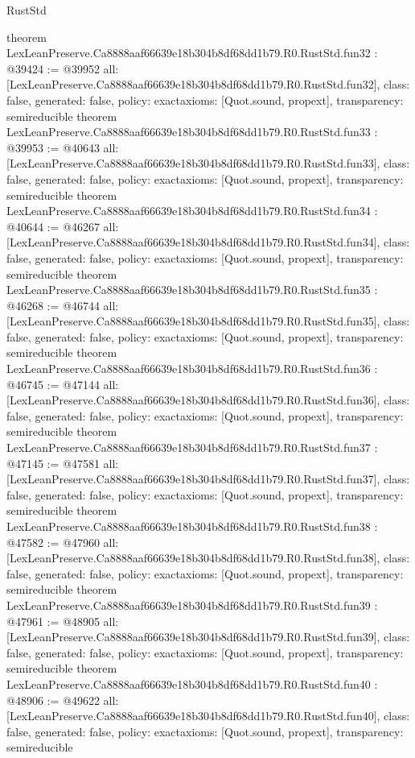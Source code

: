 \begin{lexlean}{RustStd}
\begin{coremodule}
{}
theorem LexLeanPreserve.Ca8888aaf66639e18b304b8df68dd1b79.R0.RustStd.fun32 : @39424 := @39952 {
  all: [LexLeanPreserve.Ca8888aaf66639e18b304b8df68dd1b79.R0.RustStd.fun32],
  class: false,
  generated: false,
  policy: exact{axioms: [Quot.sound, propext]},
  transparency: semireducible
}
theorem LexLeanPreserve.Ca8888aaf66639e18b304b8df68dd1b79.R0.RustStd.fun33 : @39953 := @40643 {
  all: [LexLeanPreserve.Ca8888aaf66639e18b304b8df68dd1b79.R0.RustStd.fun33],
  class: false,
  generated: false,
  policy: exact{axioms: [Quot.sound, propext]},
  transparency: semireducible
}
theorem LexLeanPreserve.Ca8888aaf66639e18b304b8df68dd1b79.R0.RustStd.fun34 : @40644 := @46267 {
  all: [LexLeanPreserve.Ca8888aaf66639e18b304b8df68dd1b79.R0.RustStd.fun34],
  class: false,
  generated: false,
  policy: exact{axioms: [Quot.sound, propext]},
  transparency: semireducible
}
theorem LexLeanPreserve.Ca8888aaf66639e18b304b8df68dd1b79.R0.RustStd.fun35 : @46268 := @46744 {
  all: [LexLeanPreserve.Ca8888aaf66639e18b304b8df68dd1b79.R0.RustStd.fun35],
  class: false,
  generated: false,
  policy: exact{axioms: [Quot.sound, propext]},
  transparency: semireducible
}
theorem LexLeanPreserve.Ca8888aaf66639e18b304b8df68dd1b79.R0.RustStd.fun36 : @46745 := @47144 {
  all: [LexLeanPreserve.Ca8888aaf66639e18b304b8df68dd1b79.R0.RustStd.fun36],
  class: false,
  generated: false,
  policy: exact{axioms: [Quot.sound, propext]},
  transparency: semireducible
}
theorem LexLeanPreserve.Ca8888aaf66639e18b304b8df68dd1b79.R0.RustStd.fun37 : @47145 := @47581 {
  all: [LexLeanPreserve.Ca8888aaf66639e18b304b8df68dd1b79.R0.RustStd.fun37],
  class: false,
  generated: false,
  policy: exact{axioms: [Quot.sound, propext]},
  transparency: semireducible
}
theorem LexLeanPreserve.Ca8888aaf66639e18b304b8df68dd1b79.R0.RustStd.fun38 : @47582 := @47960 {
  all: [LexLeanPreserve.Ca8888aaf66639e18b304b8df68dd1b79.R0.RustStd.fun38],
  class: false,
  generated: false,
  policy: exact{axioms: [Quot.sound, propext]},
  transparency: semireducible
}
theorem LexLeanPreserve.Ca8888aaf66639e18b304b8df68dd1b79.R0.RustStd.fun39 : @47961 := @48905 {
  all: [LexLeanPreserve.Ca8888aaf66639e18b304b8df68dd1b79.R0.RustStd.fun39],
  class: false,
  generated: false,
  policy: exact{axioms: [Quot.sound, propext]},
  transparency: semireducible
}
theorem LexLeanPreserve.Ca8888aaf66639e18b304b8df68dd1b79.R0.RustStd.fun40 : @48906 := @49622 {
  all: [LexLeanPreserve.Ca8888aaf66639e18b304b8df68dd1b79.R0.RustStd.fun40],
  class: false,
  generated: false,
  policy: exact{axioms: [Quot.sound, propext]},
  transparency: semireducible
}
\end{coremodule}
\end{lexlean}
